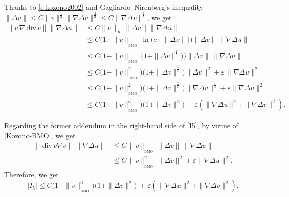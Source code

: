 \documentclass[a4paper]{article}
\providecommand{\dv}{\,\mathrm{div}\,}
\begin{document}
Thanks to \eqref{e:kozono2002} and Gagliardo--Nirenberg's inequality
$\|\Delta v\| \leq C \|v\|^{\frac13} \|\nabla\Delta v\|^{\frac23} \leq
C\|\nabla\Delta v\|^{\frac23}$, we get
%
\begin{equation*}
  \begin{aligned}
    \|v \, \nabla\dv v\| \|\nabla \Delta u\| &\le
    C\|v\|_{\infty}\|\Delta v\| \|\nabla \Delta u\|
    \\
    &\le C\Big( 1+\|v\|_{_{\textrm{BMO}}}\, \ln\big(e+\| \Delta v\|\big)\Big)
    \|\Delta v\|\, \|\nabla \Delta u\|
    \\
    &\le C \Big(1+ \|v\|_{_{\textrm{BMO}}}\,\big(1+\|\Delta
    v\|^{\frac13}\big)\Big)\|\Delta v\|\, \|\nabla \Delta u\|
    \\
    &\le C\big(1+\|v\|_{_{\textrm{BMO}}}^2\big)\big(1+\|\Delta v\|^{\frac23}\big)
    \| \Delta v\|^2+ \varepsilon\, \|\nabla \Delta u\|^2
    \\
    &\le C\big(1+\|v\|_{_{\textrm{BMO}}}^2\big)\big(1+\|\Delta v\|^{\frac23}\big)
    \| \nabla \Delta v\|^{\frac43}
    + \varepsilon \|\nabla \Delta u\|^2 \\
    & \le C\big(1+\|v\|_{_{\textrm{BMO}}}^{6}\big)\big(1+\|\Delta v\|^{2}\big)
    + \, \varepsilon (\|\nabla \Delta u\|^2+\|\nabla \Delta v\|^2).
  \end{aligned}
\end{equation*}

Regarding the former addendum in the right-hand side of \eqref{I5},
by virtue of \eqref{Kozono-BMO}, we get
%
\begin{equation*}
  \begin{aligned}
    {\|\dv v \nabla v\| \, \|\nabla \Delta u \|}&\le C\,
    \|v\|_{_{\textrm{BMO}}}\,\|\Delta v\|\, \|\nabla \Delta u\|
    \\
    &\le C\, \|v\|^2_{_{\textrm{BMO}}}\, \|\Delta v\|^2 + \varepsilon \|\nabla \Delta     u\|^2.
  \end{aligned}
\end{equation*}
Therefore, we get
%
\begin{equation}
\label{e:I5}
  |I_{5}|  \le C\big(1 + \|v\|_{_{\textrm{BMO}}}^6 \big)
  \big(1+ \|\Delta v\|^2 \big)  \, + \, \varepsilon (\|\nabla \Delta u\|^2+\|\nabla \Delta v\|^2).
\end{equation}
\end{document}
